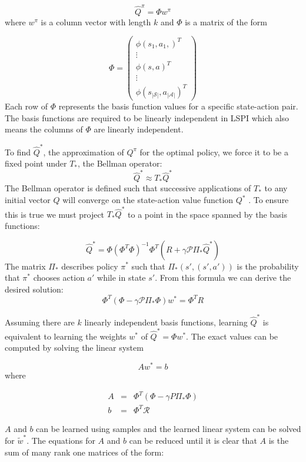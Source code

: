 \[
    \hat{Q}^\pi = \Phi w^\pi
\]
where $w^\pi$ is a column vector with length $k$ and $\Phi$ is a matrix of the form

\[
    \Phi = \begin{pmatrix}
        \phi(s_1,a_1,)^T \\ \vdots \\ \phi(s,a)^T \\ \vdots \\ \phi(s_{|\mathcal{S}|},a_{|\mathcal{A}|})^T
    \end{pmatrix}
\]
Each row of $\Phi$ represents the basis function values for a specific state-action pair. The basis functions are required to be linearly independent in LSPI which also means the columns of $\Phi$ are linearly independent.

To find $\hat{Q}^*$, the approximation of $Q^\pi$ for the optimal policy, we force it to be a fixed point under $T_*$, the Bellman operator:
\[
    \hat{Q}^* \approx T_*\hat{Q}^*
\]
The Bellman operator is defined such that successive applications of $T_*$ to any initial vector $Q$ will converge on the state-action value function $Q^*$ \cite{lspi}. To ensure this is true we must project $T_*\hat{Q}^*$ to a point in the space spanned by the basis functions:

\[
    \hat{Q}^* = \Phi(\Phi^T\Phi)^{-1}\Phi^T(R + \gamma \mathcal{P}\Pi_*\hat{Q}^*)
\]
The matrix $\Pi_*$ describes policy $\pi^*$ such that $\Pi_*(s',(s',a'))$ is the probability that $\pi^*$ chooses action $a'$ while in state $s'$. From this formula we can derive the desired solution:
\[
    \Phi^T(\Phi - \gamma \mathcal{P}\Pi_*\Phi)w^* = \Phi^TR
\]

Assuming there are $k$ linearly independent basis functions, learning $\hat{Q}^*$ is equivalent to learning the weights $w^*$ of $\hat{Q}^* = \Phi w^*$. The exact values can be computed by solving the linear system

\begin{equation}
    Aw^* = b
\end{equation}
where

\[
    \begin{array}{rcl}
        A &=& \Phi^T(\Phi - \gamma P\Pi_*\Phi) \\
        b &=& \Phi^T\mathcal{R}
    \end{array}
\]

$A$ and $b$ can be learned using samples and the learned linear system can be solved for $\tilde{w}^*$. The equations for $A$ and $b$ can be reduced until it is clear that $A$ is the sum of many rank one matrices of the form:

